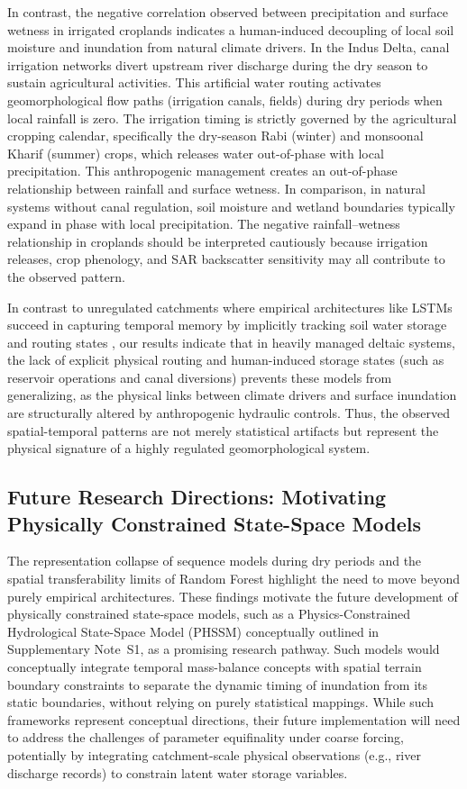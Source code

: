 In contrast, the negative correlation observed between precipitation and surface wetness in irrigated croplands indicates a human-induced decoupling of local soil moisture and inundation from natural climate drivers. In the Indus Delta, canal irrigation networks divert upstream river discharge during the dry season to sustain agricultural activities. This artificial water routing activates geomorphological flow paths (irrigation canals, fields) during dry periods when local rainfall is zero. The irrigation timing is strictly governed by the agricultural cropping calendar, specifically the dry-season Rabi (winter) and monsoonal Kharif (summer) crops, which releases water out-of-phase with local precipitation. This anthropogenic management creates an out-of-phase relationship between rainfall and surface wetness. In comparison, in natural systems without canal regulation, soil moisture and wetland boundaries typically expand in phase with local precipitation. The negative rainfall–wetness relationship in croplands should be interpreted cautiously because irrigation releases, crop phenology, and SAR backscatter sensitivity may all contribute to the observed pattern.

In contrast to unregulated catchments where empirical architectures like LSTMs succeed in capturing temporal memory by implicitly tracking soil water storage and routing states \citep{Kratzert2018, Nearing2020What}, our results indicate that in heavily managed deltaic systems, the lack of explicit physical routing and human-induced storage states (such as reservoir operations and canal diversions) prevents these models from generalizing, as the physical links between climate drivers and surface inundation are structurally altered by anthropogenic hydraulic controls. Thus, the observed spatial-temporal patterns are not merely statistical artifacts but represent the physical signature of a highly regulated geomorphological system.

\subsection{Future Research Directions: Motivating Physically Constrained State-Space Models}
The representation collapse of sequence models during dry periods and the spatial transferability limits of Random Forest highlight the need to move beyond purely empirical architectures. These findings motivate the future development of physically constrained state-space models, such as a Physics-Constrained Hydrological State-Space Model (PHSSM) conceptually outlined in Supplementary Note~S1, as a promising research pathway. Such models would conceptually integrate temporal mass-balance concepts with spatial terrain boundary constraints to separate the dynamic timing of inundation from its static boundaries, without relying on purely statistical mappings. While such frameworks represent conceptual directions, their future implementation will need to address the challenges of parameter equifinality under coarse forcing, potentially by integrating catchment-scale physical observations (e.g., river discharge records) to constrain latent water storage variables.


